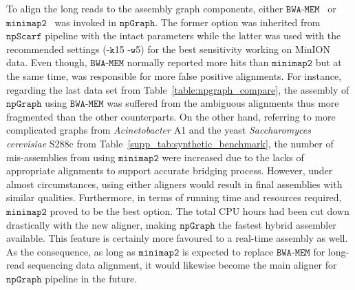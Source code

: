\documentclass[10pt,twocolumn,twoside]{genpaper}
\newcommand{\npscarf}{$\mathtt{npScarf}$}
\newcommand{\npgraph}{$\mathtt{npGraph}$}
\newcommand{\minimap}{$\mathtt{minimap2}$}
\newcommand{\bwa}{$\mathtt{BWA\text{-}MEM}$}
\begin{document}
To align the long reads to the assembly graph components, either \bwa{}~\cite{Li2013} or \minimap{}~\cite{Li2016} was invoked in \npgraph{}. 
The former option was inherited from \npscarf{} pipeline with the intact parameters
while the latter was used with the recommended settings (-$\mathtt{k}$15 -$\mathtt{w}$5) for the best sensitivity working on MinION data.
Even though, \bwa{} normally reported more hits than \minimap{} but at the same time, was responsible for more false positive alignments.
For instance, regarding the last data set from Table~\ref{table:npgraph_compare}, the assembly of \npgraph{} using \bwa{} was suffered from the ambiguous alignments thus more fragmented than the other counterparts. 
On the other hand, referring to more complicated graphs from \emph{Acinetobacter} A1 and the yeast \emph{Saccharomyces cerevisiae} S288c from Table~\ref{supp_tab:synthetic_benchmark}, the number of mis-assemblies from using \minimap{} were increased due to the lacks of appropriate alignments to support accurate bridging process.
However, under almost circumstances, using either aligners would result in final assemblies with similar qualities.
Furthermore, in terms of running time and resources required, \minimap{} proved to be the best option. 
The total CPU hours had been cut down drastically with the new aligner, making \npgraph{} the fastest hybrid assembler available.
This feature is certainly more favoured to a real-time assembly as well.
As the consequence, as long as \minimap{} is expected to replace \bwa{} for long-read sequencing data alignment, it would likewise become the main aligner for \npgraph{} pipeline in the future.
\end{document}
